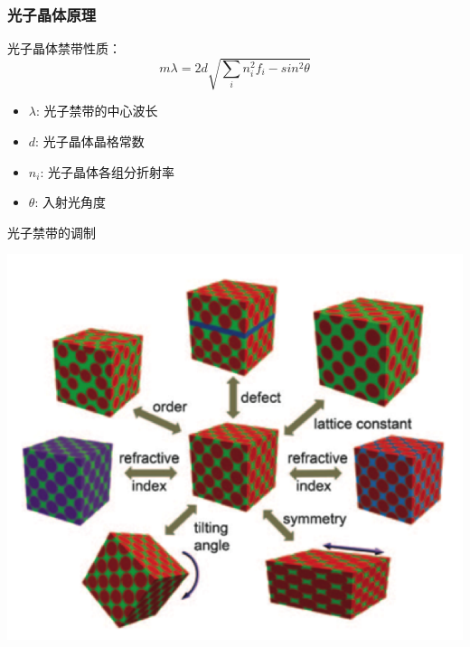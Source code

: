 \documentclass{beamer}
\begin{document}
\begin{frame}
  \frametitle{光子晶体原理}
  \begin{minipage}{0.48\textwidth}
    光子晶体禁带性质：
    \begin{equation*}
      m\lambda=2d\sqrt{\sum_{i}n_i^2f_i-sin^2\theta}
    \end{equation*}

    \pause

    \begin{itemize}
      \item
      $\lambda$: 光子禁带的中心波长
      \item
      \large $d$: 光子晶体晶格常数
      \item
      $n_i$: 光子晶体各组分折射率
      \item
      $\theta$: 入射光角度
    \end{itemize}
  \end{minipage}
  \hfill
  \pause
  \begin{minipage}{0.5\textwidth}
    光子禁带的调制
    \begin{center}
      \includegraphics[width=\linewidth]{figures/PhC_control.png}
    \end{center}
  \end{minipage}
\end{frame}
  
\end{document}
